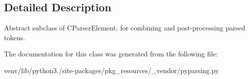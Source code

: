 \subsection{Detailed Description}
\begin{DoxyVerb}Abstract subclass of C{ParserElement}, for combining and post-processing parsed tokens.
\end{DoxyVerb}
 

The documentation for this class was generated from the following file\+:\begin{DoxyCompactItemize}
\item 
venv/lib/python3./site-\/packages/pkg\+\_\+resources/\+\_\+vendor/pyparsing.\+py\end{DoxyCompactItemize}
